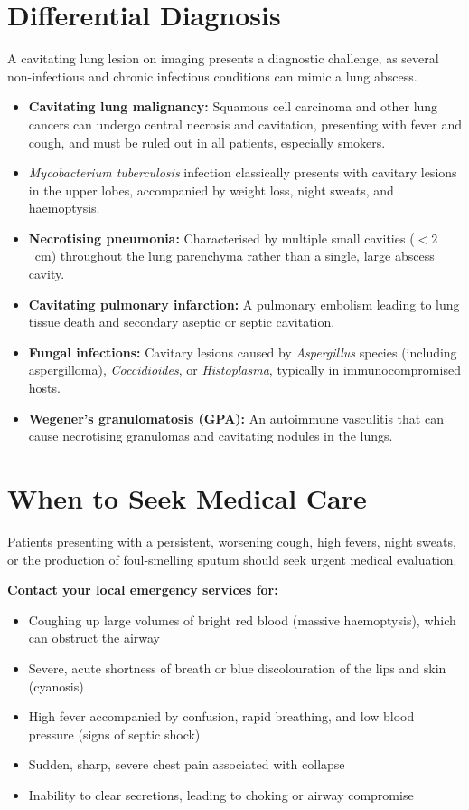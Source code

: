 \section*{Differential Diagnosis}
A cavitating lung lesion on imaging presents a diagnostic challenge, as several non-infectious and chronic infectious conditions can mimic a lung abscess.
\begin{itemize}
    \item \textbf{Cavitating lung malignancy:} Squamous cell carcinoma and other lung cancers can undergo central necrosis and cavitation, presenting with fever and cough, and must be ruled out in all patients, especially smokers.
    \item \textit{Mycobacterium tuberculosis} infection classically presents with cavitary lesions in the upper lobes, accompanied by weight loss, night sweats, and haemoptysis.
    \item \textbf{Necrotising pneumonia:} Characterised by multiple small cavities ($< 2$~cm) throughout the lung parenchyma rather than a single, large abscess cavity.
    \item \textbf{Cavitating pulmonary infarction:} A pulmonary embolism leading to lung tissue death and secondary aseptic or septic cavitation.
    \item \textbf{Fungal infections:} Cavitary lesions caused by \textit{Aspergillus} species (including aspergilloma), \textit{Coccidioides}, or \textit{Histoplasma}, typically in immunocompromised hosts.
    \item \textbf{Wegener's granulomatosis (GPA):} An autoimmune vasculitis that can cause necrotising granulomas and cavitating nodules in the lungs.
\end{itemize}

\section*{When to Seek Medical Care}
Patients presenting with a persistent, worsening cough, high fevers, night sweats, or the production of foul-smelling sputum should seek urgent medical evaluation.

\textbf{Contact your local emergency services for:}
\begin{itemize}
    \item Coughing up large volumes of bright red blood (massive haemoptysis), which can obstruct the airway
    \item Severe, acute shortness of breath or blue discolouration of the lips and skin (cyanosis)
    \item High fever accompanied by confusion, rapid breathing, and low blood pressure (signs of septic shock)
    \item Sudden, sharp, severe chest pain associated with collapse
    \item Inability to clear secretions, leading to choking or airway compromise
\end{itemize}

